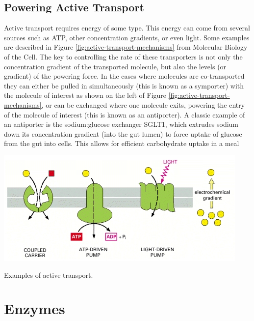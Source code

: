 \documentclass{tufte-handout}
\begin{document}
\subsection{Powering Active Transport}

Active transport requires energy of some type.  This energy can come from several sources such as ATP, other concentration gradients, or even light.  Some examples are described in Figure \ref{fig:active-transport-mechanisms} from Molecular Biology of the Cell\cite{Alberts2002a}.  The key to controlling the rate of these transporters is not only the concentration gradient of the transported molecule, but also the levels (or gradient) of the powering force.  In the cases where molecules are co-transported they can either be pulled in simultaneously (this is known as a symporter) with the molecule of interest as shown on the left of Figure \ref{fig:active-transport-mechanisms}, or can be exchanged where one molecule exits, powering the entry of the molecule of interest (this is known as an antiporter).  A classic example of an antiporter is the sodium:glucose exchanger SGLT1, which extrudes sodium down its concentration gradient (into the gut lumen) to force uptake of glucose from the gut into cells.  This allows for efficient carbohydrate uptake in a meal

\begin{marginfigure}
\includegraphics{figures/active-transport-mechanisms.jpg}\
\caption{Examples of active transport.}
\label{fig:active-transport-mechanisms}
\end{marginfigure}

\section{Enzymes}
\end{document}
